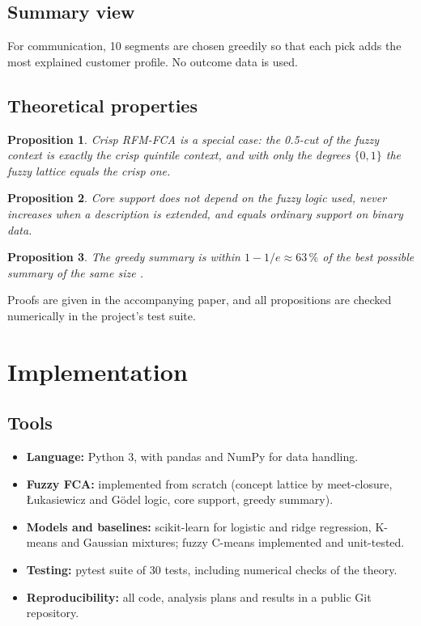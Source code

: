 \documentclass[11pt,a4paper]{article}
\newtheorem{proposition}{Proposition}
\begin{document}
\subsection{Summary view}
For communication, 10 segments are chosen greedily so that each pick adds the most explained customer profile. No outcome data is used.

\subsection{Theoretical properties}
\begin{proposition}
Crisp RFM-FCA is a special case: the 0.5-cut of the fuzzy context is exactly the crisp quintile context, and with only the degrees $\{0,1\}$ the fuzzy lattice equals the crisp one.
\end{proposition}
\begin{proposition}
Core support does not depend on the fuzzy logic used, never increases when a description is extended, and equals ordinary support on binary data.
\end{proposition}
\begin{proposition}
The greedy summary is within $1 - 1/e \approx 63\,\%$ of the best possible summary of the same size \cite{nemhauser1978}.
\end{proposition}
Proofs are given in the accompanying paper, and all propositions are checked numerically in the project's test suite.

\newpage
\section{Implementation}

\subsection{Tools}
\begin{itemize}
\item \textbf{Language:} Python 3, with pandas and NumPy for data handling.
\item \textbf{Fuzzy FCA:} implemented from scratch (concept lattice by meet-closure, Łukasiewicz and Gödel logic, core support, greedy summary).
\item \textbf{Models and baselines:} scikit-learn \cite{pedregosa2011} for logistic and ridge regression, K-means and Gaussian mixtures; fuzzy C-means implemented and unit-tested.
\item \textbf{Testing:} pytest suite of 30 tests, including numerical checks of the theory.
\item \textbf{Reproducibility:} all code, analysis plans and results in a public Git repository.
\end{itemize}
\end{document}
